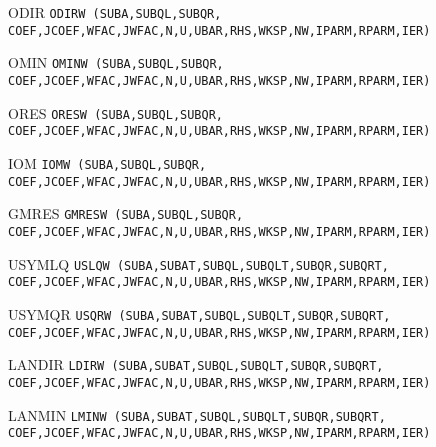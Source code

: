 \begin{list}{}{
            \leftmargin 1.00in \rightmargin 0.25in}
\item[ODIR \hfill]
{\tt ODIRW (SUBA,SUBQL,SUBQR,               \\
 \hspace*{0.75in} COEF,JCOEF,WFAC,JWFAC,N,U,UBAR,RHS,WKSP,NW,IPARM,RPARM,IER) }
 
\item[OMIN \hfill]
{\tt OMINW (SUBA,SUBQL,SUBQR,               \\
 \hspace*{0.75in} COEF,JCOEF,WFAC,JWFAC,N,U,UBAR,RHS,WKSP,NW,IPARM,RPARM,IER) }
 
\item[ORES \hfill]
{\tt ORESW (SUBA,SUBQL,SUBQR,               \\
 \hspace*{0.75in} COEF,JCOEF,WFAC,JWFAC,N,U,UBAR,RHS,WKSP,NW,IPARM,RPARM,IER) }
 
\item[IOM \hfill]
{\tt IOMW (SUBA,SUBQL,SUBQR,               \\
 \hspace*{0.75in} COEF,JCOEF,WFAC,JWFAC,N,U,UBAR,RHS,WKSP,NW,IPARM,RPARM,IER) }
 
\item[GMRES \hfill]
{\tt GMRESW (SUBA,SUBQL,SUBQR,               \\
 \hspace*{0.75in} COEF,JCOEF,WFAC,JWFAC,N,U,UBAR,RHS,WKSP,NW,IPARM,RPARM,IER) }
 
\item[USYMLQ \hfill]
{\tt USLQW (SUBA,SUBAT,SUBQL,SUBQLT,SUBQR,SUBQRT, \\
 \hspace*{0.75in} COEF,JCOEF,WFAC,JWFAC,N,U,UBAR,RHS,WKSP,NW,IPARM,RPARM,IER) }
 
\item[USYMQR \hfill]
{\tt USQRW (SUBA,SUBAT,SUBQL,SUBQLT,SUBQR,SUBQRT, \\
 \hspace*{0.75in} COEF,JCOEF,WFAC,JWFAC,N,U,UBAR,RHS,WKSP,NW,IPARM,RPARM,IER) }
 
\item[LANDIR \hfill]
{\tt LDIRW (SUBA,SUBAT,SUBQL,SUBQLT,SUBQR,SUBQRT, \\
 \hspace*{0.75in} COEF,JCOEF,WFAC,JWFAC,N,U,UBAR,RHS,WKSP,NW,IPARM,RPARM,IER) }
 
\item[LANMIN \hfill]
{\tt LMINW (SUBA,SUBAT,SUBQL,SUBQLT,SUBQR,SUBQRT, \\
 \hspace*{0.75in} COEF,JCOEF,WFAC,JWFAC,N,U,UBAR,RHS,WKSP,NW,IPARM,RPARM,IER) }
 

\end{list}
